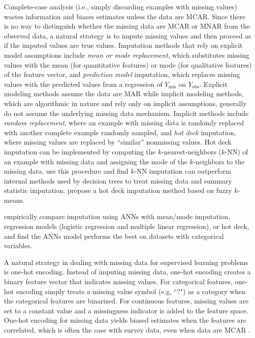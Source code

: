 \documentclass[10pt]{book}
\theoremstyle{definition}
\begin{document}
Complete-case analysis (i.e., simply discarding examples with missing values) wastes information and biases estimates unless the data are MCAR. Since there is no way to distinguish whether the missing data are MCAR or MNAR from the observed data, a natural strategy is to impute missing values and then proceed as if the imputed values are true values. Imputation methods that rely on explicit model assumptions include \emph{mean or mode replacement}, which substitutes missing values with the mean (for quantitative features) or mode (for qualitative features) of the feature vector, and \emph{prediction model} imputation, which replaces missing values with the predicted values from a regression of $Y_{\mathrm{mis}}$ on $Y_{\mathrm{obs}}$. Explicit modeling methods assume the data are MAR while implicit modeling methods, which are algorithmic in nature and rely only on implicit assumptions, generally do not assume the underlying missing data mechanism. Implicit methods include \emph{random replacement}, where an example with missing data is randomly replaced with another complete example randomly sampled, and \emph{hot deck} imputation, where missing values are replaced by ``similar'' nonmissing values. Hot deck imputation can be implemented by computing the $k$-nearest-neighbors ($k$-NN) of an example with missing data and assigning the mode of the $k$-neighbors to the missing data. \cite{batista2003analysis} use this procedure and find $k$-NN imputation can outperform internal methods used by decision trees to treat missing data and summary statistic imputation. \cite{li2004} propose a hot deck imputation method based on fuzzy $k$-means. 

\cite{silva2011} empirically compare imputation using ANNs with mean/mode imputation, regression models (logistic regression and multiple linear regression), or hot deck, and find the ANNs model performs the best on datasets with categorical variables. 

\par
{} 

A natural strategy in dealing with missing data for supervised learning problems is one-hot encoding. Instead of imputing missing data, one-hot encoding creates a binary feature vector that indicates missing values. For categorical features, one-hot encoding simply treats a missing value symbol (e.g, ``?") as a category when the categorical features are binarized. For continuous features, missing values are set to a constant value and a missingness indicator is added to the feature space. One-hot encoding for missing data yields biased estimates when the features are correlated, which is often the case with survey data, even when data are MCAR \citep{jones1996}. 
\end{document}
